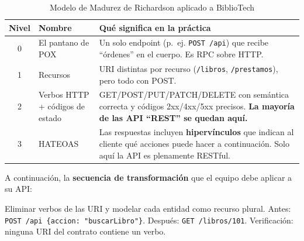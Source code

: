 \documentclass[11pt,a4paper]{article}
\begin{document}
\begin{table}[h!]
\centering
\caption{Modelo de Madurez de Richardson aplicado a BiblioTech}
\small
\begin{tabular}{c p{4.6cm} p{8.2cm}}
\toprule
\textbf{Nivel} & \textbf{Nombre} & \textbf{Qué significa en la práctica} \\
\midrule
0 & El pantano de POX & Un solo endpoint (p.~ej. \texttt{POST /api}) que recibe ``órdenes'' en el cuerpo. Es RPC sobre HTTP. \\
1 & Recursos & URI distintas por recurso (\texttt{/libros}, \texttt{/prestamos}), pero todo con POST. \\
2 & Verbos HTTP + códigos de estado & GET/POST/PUT/PATCH/DELETE con semántica correcta y códigos 2xx/4xx/5xx precisos. \textbf{La mayoría de las API ``REST'' se quedan aquí.} \\
3 & HATEOAS & Las respuestas incluyen \textbf{hipervínculos} que indican al cliente qué acciones puede hacer a continuación. Solo aquí la API es plenamente RESTful. \\
\bottomrule
\end{tabular}
\end{table}

A continuación, la \textbf{secuencia de transformación} que el equipo debe aplicar a su API:

\begin{cajapaso}
Eliminar verbos de las URI y modelar cada entidad como recurso plural. Antes: \texttt{POST /api \{accion: "buscarLibro"\}}. Después: \texttt{GET /libros/101}. Verificación: ninguna URI del contrato contiene un verbo.
\end{cajapaso}
\end{document}
